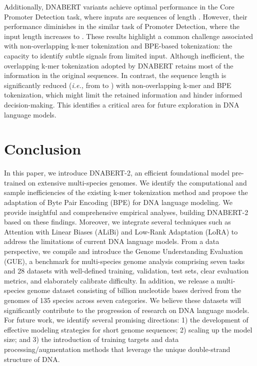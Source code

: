 \documentclass{article}
\begin{document}
Additionally, DNABERT variants achieve optimal performance in the Core Promoter Detection task, where inputs are sequences of length . However, their performance diminishes in the similar task of Promoter Detection, where the input length increases to . These results highlight a common challenge associated with non-overlapping k-mer tokenization and BPE-based tokenization: the capacity to identify subtle signals from limited input. Although inefficient, the overlapping k-mer tokenization adopted by DNABERT retains most of the information in the original sequences. In contrast, the sequence length is significantly reduced (\textit{i.e.,} from  to ) with non-overlapping k-mer and BPE tokenization, which might limit the retained information and hinder informed decision-making. This identifies a critical area for future exploration in DNA language models.














\section{Conclusion}
In this paper, we introduce DNABERT-2, an efficient foundational model pre-trained on extensive multi-species genomes. We identify the computational and sample inefficiencies of the existing k-mer tokenization method and propose the adaptation of Byte Pair Encoding (BPE) for DNA language modeling. We provide insightful and comprehensive empirical analyses, building DNABERT-2 based on these findings. Moreover, we integrate several techniques such as Attention with Linear Biases (ALiBi) and Low-Rank Adaptation (LoRA) to address the limitations of current DNA language models.
From a data perspective, we compile and introduce the Genome Understanding Evaluation (GUE), a benchmark for multi-species genome analysis comprising seven tasks and 28 datasets with well-defined training, validation, test sets, clear evaluation metrics, and elaborately calibrate difficulty. In addition, we release a multi-species genome dataset consisting of  billion nucleotide bases derived from the genomes of 135 species across seven categories. We believe these datasets will significantly contribute to the progression of research on DNA language models.
For future work, we identify several promising directions: 1) the development of effective modeling strategies for short genome sequences; 2) scaling up the model size; and 3) the introduction of training targets and data processing/augmentation methods that leverage the unique double-strand structure of DNA.
\end{document}
